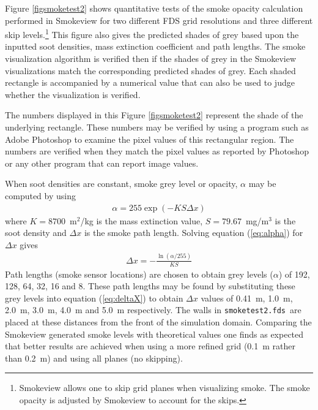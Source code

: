 \documentclass[11pt,twoside]{book}
\begin{document}
Figure \ref{figsmoketest2} shows quantitative tests of the smoke opacity calculation performed in Smokeview for two different FDS grid resolutions and three different skip levels.\footnote{Smokeview allows one to skip grid planes when visualizing smoke.  The smoke opacity is adjusted by Smokeview to account for the skips.} This figure also gives the predicted shades of grey based upon the inputted soot densities, mass extinction coefficient and path lengths.  The smoke visualization algorithm is verified then if the shades of grey in the Smokeview visualizations match the corresponding predicted shades of grey.  Each shaded
rectangle is accompanied by a numerical value that can also be used to judge whether the visualization is verified.

The numbers displayed in this Figure \ref{figsmoketest2} represent the shade of the underlying rectangle.  These numbers may be verified by using a program such as Adobe Photoshop to examine the pixel values of this rectangular region.  The numbers are verified when they match the pixel values as reported by Photoshop or any other program that can report image values.

When soot densities are constant, smoke grey level or opacity, $\alpha$ may be computed by using
\begin{eqnarray}
\label{eq:alpha}
\alpha = 255\exp(-KS\Delta x)
\end{eqnarray}
where $K=8700$~m$^2$/kg is the mass extinction value, $S=79.67$~mg/m$^3$ is the soot density
and $\Delta x$ is the smoke path length.  Solving equation (\ref{eq:alpha}) for $\Delta x$ gives
\begin{eqnarray}
\label{eq:deltaX}
\Delta x = -\frac{\ln(\alpha/255)}{KS}
\end{eqnarray}
Path lengths (smoke sensor locations) are chosen to obtain grey levels ($\alpha$) of 192, 128, 64, 32, 16 and 8.  These path lengths may be found by substituting these grey levels into equation (\ref{eq:deltaX}) to obtain $\Delta x$ values of 0.41~m, 1.0~m, 2.0~m, 3.0~m, 4.0~m and 5.0~m respectively.  The walls in {\tt smoketest2.fds}\ are placed at these distances from the front of the simulation domain.
Comparing the Smokeview generated smoke levels with theoretical values one finds as expected that better results are achieved when using a more refined grid (0.1~m rather than 0.2~m) and using all planes (no skipping).
\end{document}
